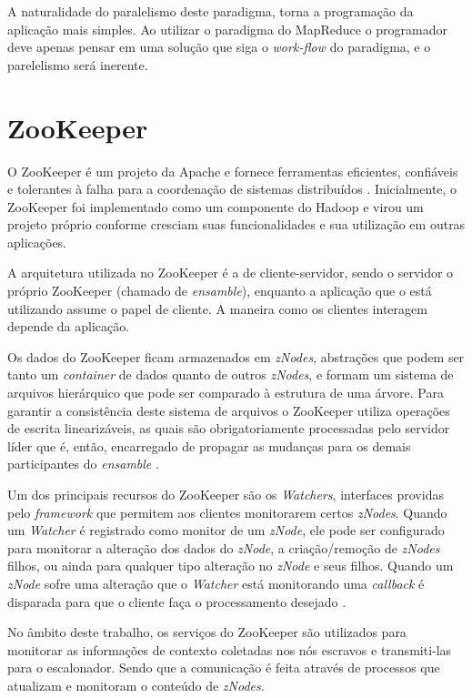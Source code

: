 A naturalidade do paralelismo deste paradigma, torna a programação da aplicação mais simples. Ao utilizar o paradigma do MapReduce o programador deve apenas pensar em uma solução que siga o \textit{work-flow} do paradigma, e o parelelismo será inerente.

\section{ZooKeeper}
O ZooKeeper é um projeto da Apache e fornece ferramentas eficientes, confiáveis e tolerantes à falha para a coordenação de sistemas distribuídos \cite{Hunt2010}. Inicialmente, o ZooKeeper foi implementado como um componente do Hadoop e virou um projeto próprio conforme cresciam suas funcionalidades e sua utilização em outras aplicações. 

A arquitetura utilizada no ZooKeeper é a de cliente-servidor, sendo o servidor o próprio ZooKeeper (chamado de \textit{ensamble}), enquanto a aplicação que o está utilizando assume o papel de cliente. A maneira como os clientes interagem depende da aplicação.

Os dados do ZooKeeper ficam armazenados em \textit{zNodes}, abstrações que podem ser tanto um \textit{container} de dados quanto de outros \textit{zNodes}, e formam um sistema de arquivos hierárquico que pode ser comparado à estrutura de uma árvore. Para garantir a consistência deste sistema de arquivos o ZooKeeper utiliza operações de escrita linearizáveis, as quais são obrigatoriamente processadas pelo servidor líder que é, então, encarregado de propagar as mudanças para os demais participantes do \textit{ensamble} \cite{Pham}.

Um dos principais recursos do ZooKeeper são os \textit{Watchers}, interfaces providas pelo \textit{framework} que permitem aos clientes monitorarem certos \textit{zNodes}. Quando um \textit{Watcher} é registrado como monitor de um \textit{zNode}, ele pode ser configurado para monitorar a alteração dos dados do \textit{zNode}, a criação/remoção de \textit{zNodes} filhos, ou ainda para qualquer tipo alteração no \textit{zNode} e seus filhos. Quando um \textit{zNode} sofre uma alteração que o \textit{Watcher} está monitorando uma \textit{callback} é disparada para que o cliente faça o processamento desejado \cite{HadoopBook}.

No âmbito deste trabalho, os serviços do ZooKeeper são utilizados para monitorar as informações de contexto coletadas nos nós escravos e transmiti-las para o escalonador. Sendo que a comunicação é feita através de processos que atualizam e monitoram o conteúdo de \textit{zNodes}.


